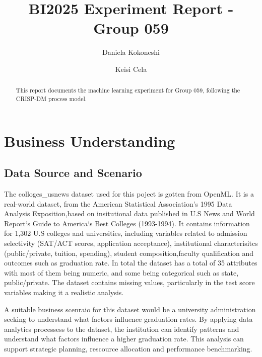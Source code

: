 \documentclass[sigconf]{acmart}
\begin{document}
\title{BI2025 Experiment Report - Group 059}

          \author{Daniela Kokoneshi}
          
          \author{Keisi Cela}
          

\begin{abstract}
  This report documents the machine learning experiment for Group 059, following the CRISP-DM process model.
\end{abstract}


\maketitle

\section{Business Understanding}

\subsection{Data Source and Scenario}
The colloges\_usnews dataset used for this poject is gotten from OpenML.
It is a real-world dataset, from the American Statistical Association's
1995 Data Analysis Exposition,based on insitutional data published in U.S
News and World Report`s Guide to America`s Best Colleges (1993-1994).
It contains information for 1,302 U.S colleges and universities,
including variables related to admission selectivity (SAT/ACT scores,
application acceptance), institutional characterisitcs (public/private,
tuition, spending), student composition,faculty qualification and outcomes
such as graduation rate. In total the dataset has a total of 35 attributes
with most of them being numeric, and some being categorical such as state,
public/private. The dataset contains missing values, particularly in the
test score variables making it a realistic analysis.

A suitable business scenraio for this dataset would be a university
administration seeking to understand what factors influence graduation rates.
By applying data analytics processess to the dataset, the institution can
identify patterns and understand what factors influence a higher graduation rate.
This analysis can support strategic planning, rescource allocation and performance
benchmarking.
\end{document}
